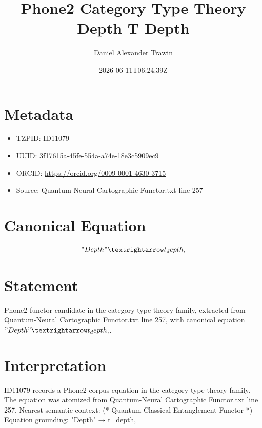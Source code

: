 \documentclass[11pt]{article}
\title{Phone2 Category Type Theory Depth T Depth}
\author{Daniel Alexander Trawin}
\date{2026-06-11T06:24:39Z}
\begin{document}
\maketitle
\section*{Metadata}
\begin{itemize}
\item TZPID: ID11079
\item UUID: 3f17615a-45fe-554a-a74e-18e3c5909ec9
\item ORCID: \url{https://orcid.org/0009-0001-4630-3715}
\item Source: Quantum-Neural Cartographic Functor.txt line 257
\end{itemize}
\section*{Canonical Equation}
\[
"Depth" → t_depth,
\]
\section*{Statement}
Phone2 functor candidate in the category type theory family, extracted from Quantum-Neural Cartographic Functor.txt line 257, with canonical equation $"Depth" → t_depth,$.
\section*{Interpretation}
ID11079 records a Phone2 corpus equation in the category type theory family. The equation was atomized from Quantum-Neural Cartographic Functor.txt line 257. Nearest semantic context: (* Quantum-Classical Entanglement Functor *) Equation grounding: "Depth" → t_depth,
\end{document}
